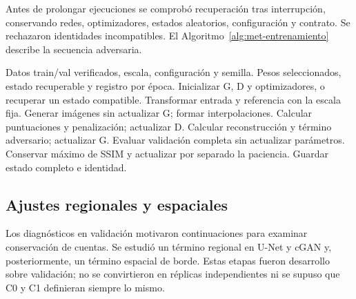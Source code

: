 Antes de prolongar ejecuciones se comprobó recuperación tras interrupción, conservando redes, optimizadores, estados aleatorios, configuración y contrato. Se rechazaron identidades incompatibles. El Algoritmo~\ref{alg:met-entrenamiento} describe la secuencia adversaria.
\begin{algorithm}[htbp]\small
\caption{Entrenamiento condicional y selección con validación.}\label{alg:met-entrenamiento}
\begin{algorithmic}[1]
\Require Datos train/val verificados, escala, configuración y semilla.
\Ensure Pesos seleccionados, estado recuperable y registro por época.
\State Inicializar G, D y optimizadores, o recuperar un estado compatible.
\State Transformar entrada y referencia con la escala fija.
\State Generar imágenes sin actualizar G; formar interpolaciones.
\State Calcular puntuaciones y penalización; actualizar D.
\EndFor
\State Calcular reconstrucción y término adversario; actualizar G.
\EndFor
\State Evaluar validación completa sin actualizar parámetros.
\State Conservar máximo de SSIM y actualizar por separado la paciencia.
\State Guardar estado completo e identidad.
\EndFor
\end{algorithmic}\end{algorithm}

\subsection{Ajustes regionales y espaciales}
Los diagnósticos en validación motivaron continuaciones para examinar conservación de cuentas. Se estudió un término regional en U-Net y cGAN y, posteriormente, un término espacial de borde. Estas etapas fueron desarrollo sobre validación; no se convirtieron en réplicas independientes ni se supuso que C0 y C1 definieran siempre lo mismo.

